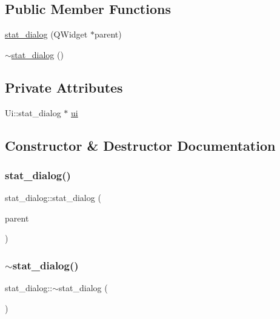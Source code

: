 \subsection*{Public Member Functions}
\begin{DoxyCompactItemize}
\item 
\mbox{\hyperlink{classstat__dialog_a4a77448d9196257a4a5e0aebf02a0ab7}{stat\+\_\+dialog}} (Q\+Widget $\ast$parent)
\item 
\mbox{\hyperlink{classstat__dialog_ac628e47d8eb4d3972ec6dbf6f42d6df3}{$\sim$stat\+\_\+dialog}} ()
\end{DoxyCompactItemize}
\subsection*{Private Attributes}
\begin{DoxyCompactItemize}
\item 
Ui\+::stat\+\_\+dialog $\ast$ \mbox{\hyperlink{classstat__dialog_a698af1b38fe457968baa821f106d0563}{ui}}
\end{DoxyCompactItemize}


\subsection{Constructor \& Destructor Documentation}
\mbox{\label{classstat__dialog_a4a77448d9196257a4a5e0aebf02a0ab7}} 
\subsubsection{\texorpdfstring{stat\_dialog()}{stat\_dialog()}}
{\footnotesize\ttfamily stat\+\_\+dialog\+::stat\+\_\+dialog (\begin{DoxyParamCaption}\item[{Q\+Widget $\ast$}]{parent }\end{DoxyParamCaption})\hspace{0.3cm}{\ttfamily [explicit]}}

\mbox{\label{classstat__dialog_ac628e47d8eb4d3972ec6dbf6f42d6df3}} 
\subsubsection{\texorpdfstring{$\sim$stat\_dialog()}{~stat\_dialog()}}
{\footnotesize\ttfamily stat\+\_\+dialog\+::$\sim$stat\+\_\+dialog (\begin{DoxyParamCaption}{ }\end{DoxyParamCaption})}



